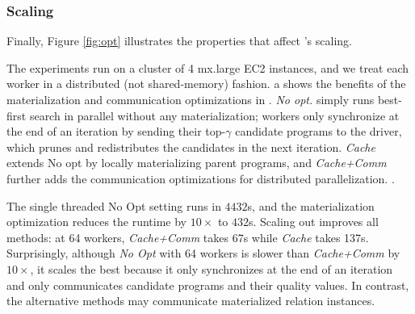 

\subsubsection{Scaling}
Finally, Figure \ref{fig:opt} illustrates the properties that affect \sys's scaling.  

 The experiments run on a cluster of 4 mx.large EC2 instances, and we treat each worker in a distributed (not shared-memory) fashion.   a shows the benefits of the materialization and communication optimizations in .  {\it No opt.} simply runs best-first search in parallel without any materialization; workers only synchronize at the end of an iteration by sending their top-$\gamma$ candidate programs to the driver, which prunes and redistributes the candidates in the next iteration.  {\it Cache} extends No opt by locally materializing parent programs, and {\it Cache+Comm} further adds the communication optimizations for distributed parallelization.   . 

The single threaded No Opt setting runs in $4432$s, and the materialization optimization reduces the runtime by $10\times$ to $432$s.   Scaling out improves all methods: at 64 workers, {\it Cache+Comm} takes 67s while {\it Cache} takes 137s.  Surprisingly, although {\it No Opt} with 64 workers is slower than {\it Cache+Comm} by $10\times$, it scales the best because it only synchronizes at the end of an iteration and only communicates candidate programs and their quality values.  In contrast, the alternative methods may communicate materialized relation instances.  

